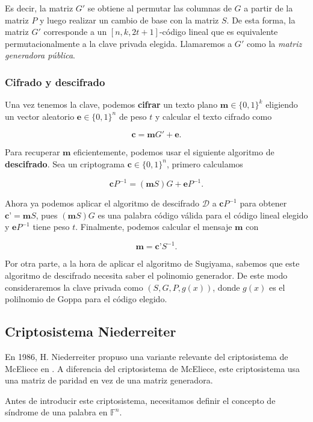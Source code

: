 Es decir, la matriz $G'$ se obtiene al permutar las columnas de $G$ a partir de la matriz $P$ y luego realizar un cambio de base con la matriz $S$. De esta forma, la matriz $G'$ corresponde a un $[n, k, 2t + 1]$-código lineal que es equivalente permutacionalmente a la clave privada elegida. Llamaremos a $G'$ como la \emph{matriz generadora pública}.

\subsubsection{Cifrado y descifrado}

Una vez tenemos la clave, podemos \textbf{cifrar} un texto plano $\textbf{m} \in \{ 0, 1 \}^k$ eligiendo un vector aleatorio $\textbf{e} \in \{ 0, 1 \}^n$ de peso $t$ y calcular el texto cifrado como

$$\textbf{c} = \textbf{m} G' + \textbf{e}.$$

Para recuperar $\textbf{m}$ eficientemente, podemos usar el siguiente algoritmo de \textbf{descifrado}. Sea un criptograma $\textbf{c} \in \{ 0, 1 \}^n$, primero calculamos

$$\textbf{c} P^{-1} = (\textbf{m} S) G + \textbf{e} P^{-1}.$$

Ahora ya podemos aplicar el algoritmo de descifrado $\mathcal{D}$ a $\textbf{c} P^{-1}$ para obtener $\textbf{c'} = \textbf{m} S$, pues $(\textbf{m} S) G$ es una palabra código válida para el código lineal elegido y $\textbf{e} P^{-1}$ tiene peso $t$. Finalmente, podemos calcular el mensaje $\textbf{m}$ con

$$\textbf{m} = \textbf{c'} S^{-1}.$$

Por otra parte, a la hora de aplicar el algoritmo de Sugiyama, sabemos que este algoritmo de descifrado necesita saber el polinomio generador. De este modo consideraremos la clave privada como $(S, G, P, g(x))$, donde $g(x)$ es el polilnomio de Goppa para el código elegido.


\subsection{Criptosistema Niederreiter}

En 1986, H. Niederreiter propuso una variante relevante del criptosistema de McEliece en \cite{Niederreiter_1986}. A diferencia del criptosistema de McEliece, este criptosistema usa una matriz de paridad en vez de una matriz generadora.

Antes de introducir este criptosistema, necesitamos definir el concepto de síndrome de una palabra en $\mathbb{F}^n$.

